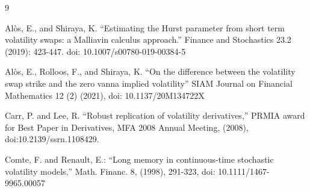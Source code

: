 \documentclass[11pt]{article}
\begin{document}
\begin{thebibliography}{9}





 Al\`{o}s, E., and Shiraya, K. ``Estimating the Hurst parameter from short term volatility swaps: a Malliavin calculus approach.'' Finance and Stochastics 23.2 (2019): 423-447. doi: 10.1007/s00780-019-00384-5

 Al\`{o}s, E., Rolloos, F., and Shiraya, K. ``On the difference between the volatility swap strike and the zero vanna implied volatility'' SIAM Journal on Financial Mathematics 12 (2) (2021), doi: 10.1137/20M134722X



 Carr, P. and Lee, R. ``Robust replication of volatility derivatives,'' PRMIA award for Best Paper in Derivatives, MFA 2008 Annual Meeting, (2008), doi:10.2139/ssrn.1108429. 


 Comte, F. and Renault, E.: ``Long memory in continuous-time stochastic volatility models,''  Math. Financ. 8, (1998), 291-323, doi: 10.1111/1467-9965.00057



\end{thebibliography}
\end{document}
